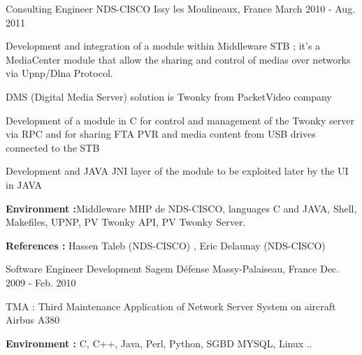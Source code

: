 \documentclass[11pt, a4paper]{awesome-cv} %
\begin{document}
\begin{cventries}
    \cventry
    {Consulting Engineer} %
    {NDS-CISCO} %
    {Issy les Moulineaux, France} %
    {March 2010 - Aug. 2011} %
    { %
        \begin{cvitems}
            \item {Development and integration of a module within Middleware STB ; it’s a MediaCenter module that allow the sharing and control of medias over networks via Upnp/Dlna Protocol.}
            \item {DMS (Digital Media Server) solution is Twonky from PacketVideo company }
            \item {Development of a module in C for control and management of the Twonky server via RPC and for sharing FTA PVR and media content from USB drives connected to the STB}
            \item {Development and JAVA JNI  layer of the module to be exploited later by the UI in JAVA}
            \item { \textbf{Environment :}Middleware MHP de NDS-CISCO, languages C and JAVA, Shell, Makefiles, UPNP, PV Twonky API, PV Twonky Server. }
            \item { \textbf{References :} Hassen Taleb (NDS-CISCO) , Eric Delaunay (NDS-CISCO) }
        \end{cvitems}
    }


    \cventry
    {Software Engineer Development} %
    {Sagem Défense} %
    {Massy-Palaiseau, France} %
    {Dec. 2009 - Feb. 2010} %
    { %
        \begin{cvitems}
            \item {TMA : Third Maintenance Application of Network Server System on aircraft Airbus A380}
            \item { \textbf{Environment :} C, C++, Java, Perl, Python, SGBD MYSQL, Linux .. }
        \end{cvitems}
    }



\end{cventries}
\end{document}
